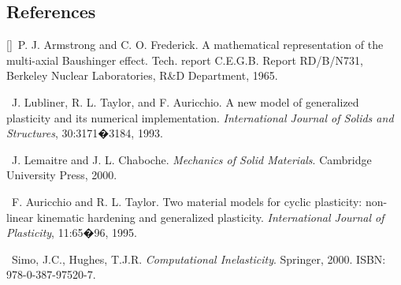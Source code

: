 \documentclass[11pt]{report}
\numberwithin{equation}{section}
\newcounter{sectrefs}
\begin{document}
 
\subsection {References}
\small
[\label {R:FA1965}\thesectrefs]~P. J. Armstrong and C. O. Frederick. A mathematical representation of the
multi-axial Baushinger effect. Tech. report C.E.G.B. Report RD/B/N731,
Berkeley Nuclear Laboratories, R\&D Department, 1965.

\medskip
{}~J. Lubliner, 
R. L. Taylor, and F. Auricchio. A new model of generalized 
plasticity and its numerical implementation. \textit{International Journal of Solids 
and Structures}, 30:3171�3184, 1993.

\medskip
{}~J. Lemaitre and 
J. L. Chaboche. \textit{Mechanics of Solid Materials}. Cambridge 
University Press, 2000.

\medskip
{}~F. Auricchio 
and R. L. Taylor. Two material models for cyclic plasticity:
non-linear kinematic hardening and generalized plasticity. \textit{International Journal 
of Plasticity}, 11:65�96, 1995. 

\medskip
{}~Simo, J.C., 
Hughes, T.J.R. \textit{Computational
Inelasticity}. Springer, 2000. ISBN: 978-0-387-97520-7.
\end{document}
